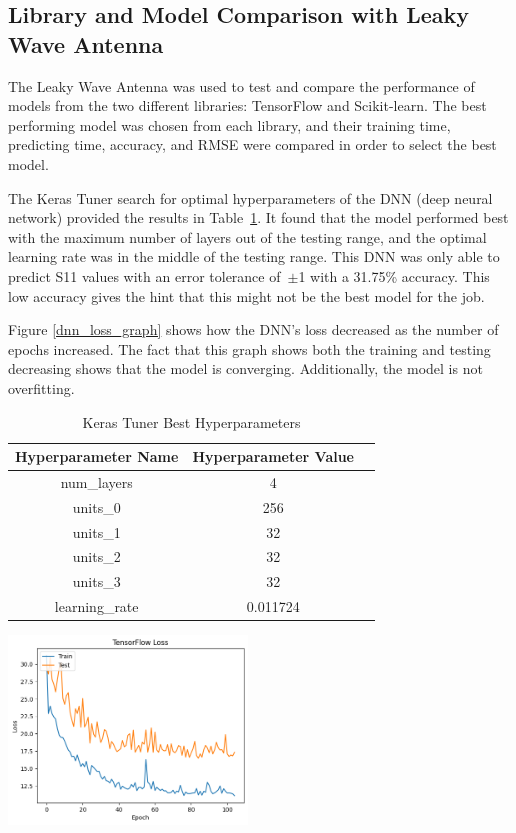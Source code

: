 \documentclass[lettersize,journal]{IEEEtran}
\newenvironment{Figure}
    {\par\medskip\noindent\minipage{\linewidth}}
    {\endminipage\par\medskip}
\begin{document}
\subsection{Library and Model Comparison with Leaky Wave Antenna}
The Leaky Wave Antenna was used to test and compare the performance of models from the two different libraries: TensorFlow and Scikit-learn. The best performing model was chosen from each library, and their training time, predicting time, accuracy, and RMSE were compared in order to select the best model.

The Keras Tuner search for optimal hyperparameters of the DNN (deep neural network) provided the results in Table~\ref{keras_best_params}. It found that the model performed best with the maximum number of layers out of the testing range, and the optimal learning rate was in the middle of the testing range. This DNN was only able to predict S11 values with an error tolerance of~$\pm$1 with a 31.75\% accuracy. This low accuracy gives the hint that this might not be the best model for the job.

Figure \ref{dnn_loss_graph} shows how the DNN's loss decreased as the number of epochs increased. The fact that this graph shows both the training and testing decreasing shows that the model is converging. Additionally, the model is not overfitting. 

\begin{table}[h]
\caption{Keras Tuner Best Hyperparameters}
\begin{center}
\begin{tabular}{ |c|c|c| }
    \hline
    Hyperparameter Name & Hyperparameter Value \\ 
    \hline
    num\_layers & 4 \\  
    \hline
    units\_0 & 256 \\
    \hline
    units\_1 & 32 \\
    \hline
    units\_2 & 32 \\
    \hline
    units\_3 & 32 \\
    \hline
    learning\_rate & 0.011724 \\
    \hline
\end{tabular}
\end{center}
\label{keras_best_params}
\end{table}

\begin{Figure}
    \centering
    \includegraphics[width=2.5in]{loss}
    \label{dnn_loss_graph}
\end{Figure}
\end{document}

